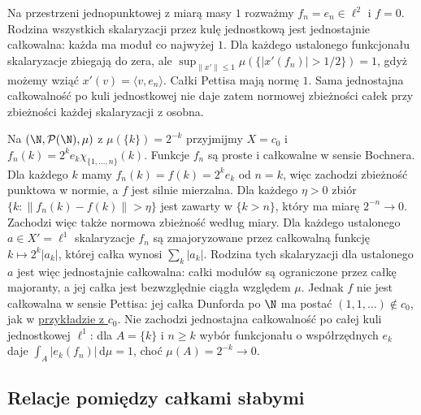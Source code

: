 \begin{przyklad}
\label{ex:weak-vitali-distinction15b}
Na przestrzeni jednopunktowej z miarą masy $1$ rozważmy
$f_n=e_n\in\ell^2$ i $f=0$. Rodzina wszystkich skalaryzacji
przez kulę jednostkową jest jednostajnie całkowalna:
każda ma moduł co najwyżej $1$. Dla każdego ustalonego
funkcjonału skalaryzacje zbiegają do zera, ale
$\sup_{\|x'\|\le1}\mu(\{|x'(f_n)|>1/2\})=1$,
gdyż możemy wziąć $x'(v)=\langle v,e_n\rangle$.
Całki Pettisa mają normę $1$. Sama jednostajna
całkowalność po kuli jednostkowej nie daje zatem
normowej zbieżności całek przy zbieżności każdej
skalaryzacji z osobna.

Na $(\N,\mathcal P(\N),\mu)$ z $\mu(\{k\})=2^{-k}$
przyjmijmy $X=c_0$ i
$f_n(k)=2^ke_k\chi_{\{1,\ldots,n\}}(k)$.
Funkcje $f_n$ są proste i całkowalne w sensie Bochnera.
Dla każdego $k$ mamy $f_n(k)=f(k)=2^ke_k$ od $n=k$,
więc zachodzi zbieżność punktowa w normie, a $f$ jest
silnie mierzalna. Dla każdego $\eta>0$ zbiór
$\{k:\|f_n(k)-f(k)\|>\eta\}$ jest zawarty w $\{k>n\}$,
który ma miarę $2^{-n}\to0$. Zachodzi więc także
normowa zbieżność według miary.
Dla każdego ustalonego $a\in X'=\ell^1$ skalaryzacje
$f_n$ są zmajoryzowane przez całkowalną funkcję
$k\mapsto 2^k|a_k|$, której całka wynosi $\sum_k|a_k|$.
Rodzina tych skalaryzacji dla ustalonego $a$ jest
więc jednostajnie całkowalna: całki modułów są
ograniczone przez całkę majoranty, a jej całka jest
bezwzględnie ciągła względem $\mu$.
Jednak $f$ nie jest całkowalna w sensie Pettisa:
jej całka Dunforda po $\N$ ma postać $(1,1,\ldots)\notin c_0$,
jak w \hyperref[ex:dunford-not-pettis15b]{przykładzie z $c_0$}.
Nie zachodzi jednostajna całkowalność po całej kuli
jednostkowej $\ell^1$: dla $A=\{k\}$ i $n\ge k$
wybór funkcjonału o współrzędnych $e_k$ daje
$\int_A|e_k(f_n)|\,\mathrm d\mu=1$, choć
$\mu(A)=2^{-k}\to0$.
\end{przyklad}

\subsection{Relacje pomiędzy całkami słabymi}

